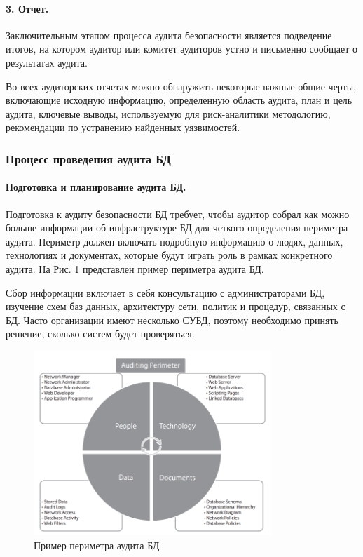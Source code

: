 \paragraph{3. Отчет.}

Заключительным этапом процесса аудита безопасности является подведение итогов, на котором аудитор или комитет аудиторов устно и письменно сообщает о результатах аудита.

Во всех аудиторских отчетах можно обнаружить некоторые важные общие черты, включающие исходную информацию, определенную область аудита, план и цель аудита, ключевые выводы, используемую для риск-аналитики методологию, рекомендации по устранению найденных уязвимостей.

\subsubsection{Процесс проведения аудита БД}

\paragraph{Подготовка и планирование аудита БД.}

Подготовка к аудиту безопасности БД требует, чтобы аудитор собрал как можно больше информации об инфраструктуре БД для четкого определения периметра аудита. Периметр должен включать подробную информацию о людях, данных, технологиях и документах, которые будут играть роль в рамках конкретного аудита. На Рис. \ref{fig:DB_audit_perimeter} представлен пример периметра аудита БД.

Сбор информации включает в себя консультацию с администраторами БД, изучение схем баз данных, архитектуру сети, политик и процедур, связанных с БД. Часто организации имеют несколько СУБД, поэтому необходимо принять решение, сколько систем будет проверяться.

\begin{figure}[h!]
    \centering
    \includegraphics[width=0.8\textwidth]{assets/DB_audit_perimeter}
    \caption{Пример периметра аудита БД}
	\label{fig:DB_audit_perimeter}
\end{figure}

